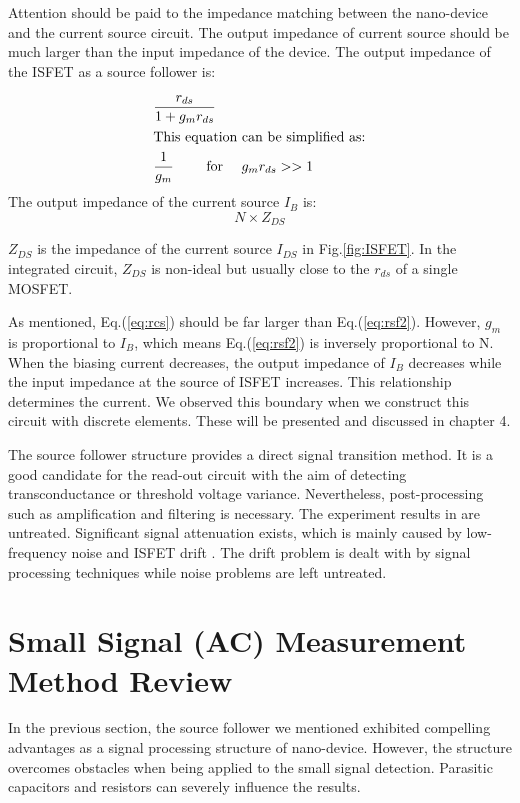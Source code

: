 Attention should be paid to the impedance matching between the nano-device and the current source circuit.
The output impedance of current source should be much larger than the input impedance of the device.
The output impedance of the ISFET as a source follower is:

\begin{align}
    & \frac{r_{ds}}{1 + g_mr_{ds}}\\
\intertext{This equation can be simplified as:}
    & \frac{1}{g_m} \qquad \text{ for } \quad g_mr_{ds} >> 1 \label{eq:rsf2}
\end{align}
The output impedance of the current source $I_B$ is:
\begin{equation} \label{eq:rcs}
    N\times Z_{DS}
\end{equation}

$Z_{DS}$ is the impedance of the current source $I_{DS}$ in Fig.\ref{fig:ISFET}.
In the integrated circuit, $Z_{DS}$ is non-ideal but usually close to the $r_{ds}$ of a single MOSFET.

As mentioned, Eq.(\ref{eq:rcs}) should be far larger than Eq.(\ref{eq:rsf2}).
However, $g_m$ is proportional to $I_B$, which means Eq.(\ref{eq:rsf2}) is inversely proportional to N.
When the biasing current decreases, the output impedance of $I_B$ decreases while the input impedance at the source of ISFET increases.
This relationship determines the current.
We observed this boundary when we construct this circuit with discrete elements.
These will be presented and discussed in chapter 4.

The source follower structure provides a direct signal transition method.
It is a good candidate for the read-out circuit with the aim of detecting transconductance or threshold voltage variance.
Nevertheless, post-processing such as amplification and filtering is necessary.
The experiment results in \cite{SF1} are untreated.
Significant signal attenuation exists, which is mainly caused by low-frequency noise and ISFET drift \cite{Drift}.
The drift problem is dealt with by signal processing techniques while noise problems are left untreated.


\section{Small Signal (AC) Measurement Method Review}  \label{sec:AC}
In the previous section, the source follower we mentioned exhibited compelling advantages as a signal processing structure of nano-device.
However, the structure overcomes obstacles when being applied to the small signal detection.
Parasitic capacitors and resistors can severely influence the results.

